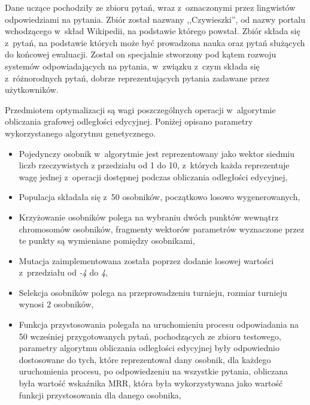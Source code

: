 \documentclass[a4paper, twoside, 12pt]{report}
\begin{document}
        Dane uczące pochodziły ze zbioru pytań, wraz z~oznaczonymi przez lingwistów odpowiedziami na pytania. Zbiór został
        nazwany ,,Czywieszki'', od nazwy portalu wchodzącego w~skład Wikipedii, na podstawie którego powstał\cite{CZYWIESZKI}.
        Zbiór składa się z~pytań, na podstawie których może być prowadzona nauka oraz pytań służących do końcowej ewaluacji.
        Został on specjalnie stworzony pod kątem rozwoju systemów odpowiadających na pytania, w~związku z~czym składa się
        z~różnorodnych pytań, dobrze reprezentujących pytania zadawane przez użytkowników.

        Przedmiotem optymalizacji są wagi poszczególnych operacji w~algorytmie obliczania grafowej odległości edycyjnej.
        Poniżej opisano parametry wykorzystanego algorytmu genetycznego.
        \begin{itemize}
            \item Pojedynczy osobnik w~algorytmie jest reprezentowany jako wektor siedmiu liczb rzeczywistych z
                przedziału od 1 do 10, z~których każda reprezentuje wagę jednej z~operacji dostępnej podczas obliczania
                odległości edycyjnej,
            \item Populacja składała się z~50 osobników, początkowo losowo wygenerowanych,
            \item Krzyżowanie osobników polega na wybraniu dwóch punktów wewnątrz chromosomów osobników, fragmenty
                wektorów parametrów wyznaczone przez te punkty są wymieniane pomiędzy osobnikami,
            \item Mutacja zaimplementowana została poprzez dodanie losowej wartości z~przedziału od \emph{-4} do \emph{4},
            \item Selekcja osobników polega na przeprowadzeniu turnieju, rozmiar turnieju wynosi 2 osobników,
            \item Funkcja przystosowania polegała na uruchomieniu procesu odpowiadania na 50 wcześniej przygotowanych
                pytań, pochodzących
                ze zbioru testowego, parametry algorytmu obliczania odległości edycyjnej były odpowiednio dostosowane do
                tych, które reprezentował dany osobnik, dla każdego uruchomienia procesu, po odpowiedzeniu na wszystkie
                pytania, obliczana była wartość wskaźnika MRR, która była wykorzystywana jako wartość funkcji przystosowania dla
                danego osobnika,
        \end{itemize}
\end{document}
